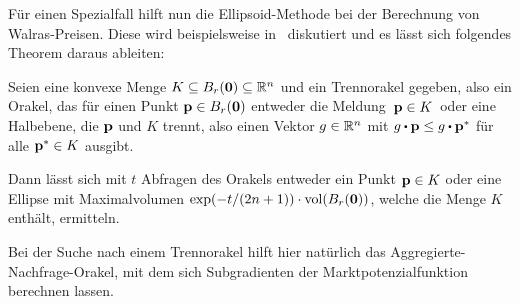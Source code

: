 Für einen Spezialfall hilft nun die Ellipsoid-Methode bei der Berechnung von Walras-Preisen.
Diese wird beispielsweise in~\cite[Abschnitt~2]{ellipsoid} diskutiert und es lässt sich folgendes Theorem daraus ableiten:

\begin{theorem}
Seien eine konvexe Menge $K\subseteq B_r(\mathbf{0})\subseteq \mathbb{R}^n$ und ein Trennorakel gegeben, also ein Orakel, das für einen Punkt $\mathbf{p}\in B_r(\mathbf{0})$  entweder die Meldung \glqq\,$\mathbf{p}\in K$\grqq\ oder eine Halbebene, die $\mathbf{p}$ und $K$ trennt, also einen Vektor $g\in\mathbb{R}^n$ mit $g\bcdot \fp \leq g \bcdot \fp^*$ für alle $\mathbf{p}^*\in K$ ausgibt.

Dann lässt sich mit $t$ Abfragen des Orakels entweder ein Punkt $\mathbf{p}\in K$ oder eine Ellipse mit Maximalvolumen $\exp({-t / ({2n + 1}})) \cdot \operatorname{vol}(B_r(\mathbf{0}))$, welche die Menge $K$ enthält, ermitteln.
\end{theorem}

Bei der Suche nach einem Trennorakel hilft hier natürlich das Aggregierte-Nachfrage-Orakel, mit dem sich Subgradienten der Marktpotenzialfunktion berechnen lassen.


